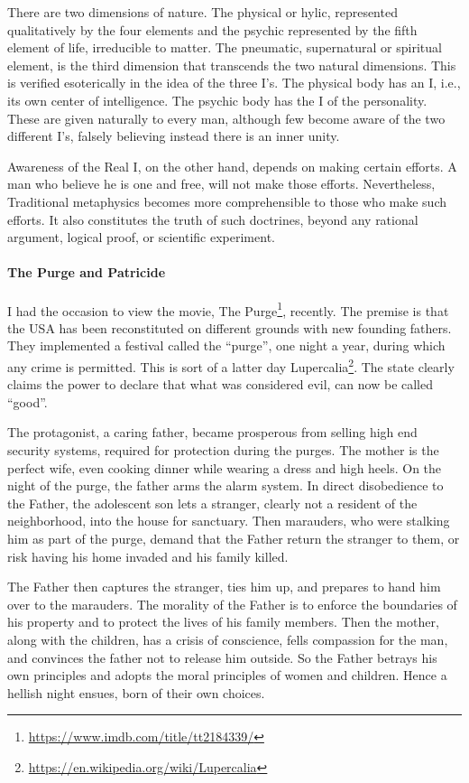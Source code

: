 There are two dimensions of nature. The physical or hylic, represented qualitatively by the four elements and the psychic represented by the fifth element of life, irreducible to matter. The pneumatic, supernatural or spiritual element, is the third dimension that transcends the two natural dimensions. This is verified esoterically in the idea of the three I's. The physical body has an I, i.e., its own center of intelligence. The psychic body has the I of the personality. These are given naturally to every man, although few become aware of the two different I's, falsely believing instead there is an inner unity.

Awareness of the Real I, on the other hand, depends on making certain efforts. A man who believe he is one and free, will not make those efforts. Nevertheless, Traditional metaphysics becomes more comprehensible to those who make such efforts. It also constitutes the truth of such doctrines, beyond any rational argument, logical proof, or scientific experiment.


\paragraph{The Purge and Patricide}

I had the occasion to view the movie, The Purge\footnote{\url{https://www.imdb.com/title/tt2184339/}}, recently. The premise is that the USA has been reconstituted on different grounds with new founding fathers. They implemented a festival called the ``purge'', one night a year, during which any crime is permitted. This is sort of a latter day Lupercalia\footnote{\url{https://en.wikipedia.org/wiki/Lupercalia}}. The state clearly claims the power to declare that what was considered evil, can now be called ``good''.

The protagonist, a caring father, became prosperous from selling high end security systems, required for protection during the purges. The mother is the perfect wife, even cooking dinner while wearing a dress and high heels. On the night of the purge, the father arms the alarm system. In direct disobedience to the Father, the adolescent son lets a stranger, clearly not a resident of the neighborhood, into the house for sanctuary. Then marauders, who were stalking him as part of the purge, demand that the Father return the stranger to them, or risk having his home invaded and his family killed.

The Father then captures the stranger, ties him up, and prepares to hand him over to the marauders. The morality of the Father is to enforce the boundaries of his property and to protect the lives of his family members. Then the mother, along with the children, has a crisis of conscience, fells compassion for the man, and convinces the father not to release him outside. So the Father betrays his own principles and adopts the moral principles of women and children. Hence a hellish night ensues, born of their own choices.

